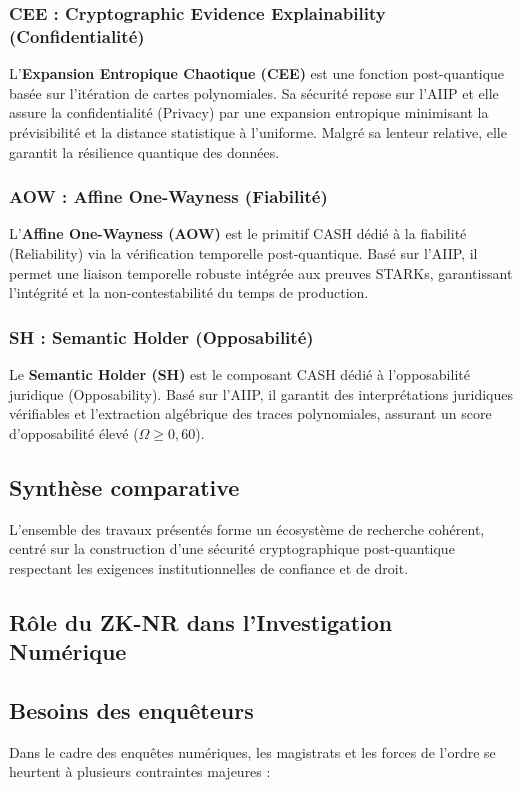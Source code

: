 \documentclass[12pt]{article}
\begin{document}
\begin{center}
\subsubsection{CEE : Cryptographic Evidence Explainability (Confidentialité)}
L’\textbf{Expansion Entropique Chaotique (CEE)} est une fonction post-quantique basée sur l’itération de cartes polynomiales. Sa sécurité repose sur l’AIIP et elle assure la confidentialité (Privacy) par une expansion entropique minimisant la prévisibilité et la distance statistique à l’uniforme. Malgré sa lenteur relative, elle garantit la résilience quantique des données.

\subsubsection{AOW : Affine One-Wayness (Fiabilité)}
L’\textbf{Affine One-Wayness (AOW)} est le primitif CASH dédié à la fiabilité (Reliability) via la vérification temporelle post-quantique. Basé sur l’AIIP, il permet une liaison temporelle robuste intégrée aux preuves STARKs, garantissant l’intégrité et la non-contestabilité du temps de production.

\subsubsection{SH : Semantic Holder (Opposabilité)}
Le \textbf{Semantic Holder (SH)} est le composant CASH dédié à l’opposabilité juridique (Opposability). Basé sur l’AIIP, il garantit des interprétations juridiques vérifiables et l’extraction algébrique des traces polynomiales, assurant un score d’opposabilité élevé (\(\Omega \ge 0,60\)).

\subsection*{Synthèse comparative}
L’ensemble des travaux présentés forme un écosystème de recherche cohérent, centré sur la construction d’une sécurité cryptographique post-quantique respectant les exigences institutionnelles de confiance et de droit.

\subsection*{Rôle du ZK-NR dans l’Investigation Numérique}

\subsection*{ Besoins des enquêteurs}
Dans le cadre des enquêtes numériques, les magistrats et les forces de l’ordre se heurtent à plusieurs contraintes majeures :  


\end{center}
\end{document}
